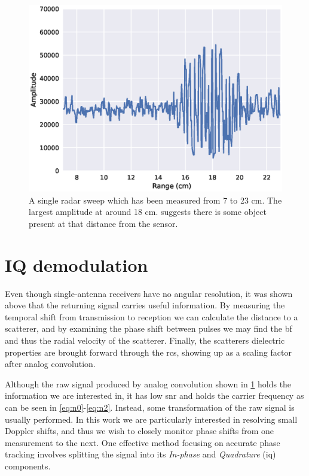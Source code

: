 \begin{figure}[h]
	\centering
	\includegraphics[scale=0.7]{figs_temp/single_sweep_raw}
	\caption{A single radar sweep which has been measured from 7 to 23 cm. The largest amplitude at around 18 cm. suggests there is some object present at that distance from the sensor.}
	\label{fig:single_sweep_raw}
\end{figure}

\section{IQ demodulation}
\label{IQ}

Even though single-antenna receivers have no angular resolution, it was shown above that the returning signal carries useful information. By measuring the temporal shift from transmission to reception we can calculate the distance to a scatterer, and by examining the phase shift between pulses we may find the \gls{bf} and thus the radial velocity of the scatterer. Finally, the scatterers dielectric properties are brought forward through the \gls{rcs}, showing up as a scaling factor after analog convolution. 

Although the raw signal produced by analog convolution shown in \ref{fig:single_sweep_raw} holds the information we are interested in, it has low \gls{snr} \citep{richards_2014} and holds the carrier frequency as can be seen in \ref{eq:n0}-\ref{eq:n2}. Instead, some transformation of the raw signal is usually performed. In this work we are particularly interested in resolving small Doppler shifts, and thus we wish to closely monitor phase shifts from one measurement to the next. One effective method focusing on accurate phase tracking involves splitting the signal into its \emph{In-phase} and \emph{Quadrature} (\gls{iq}) components. 

